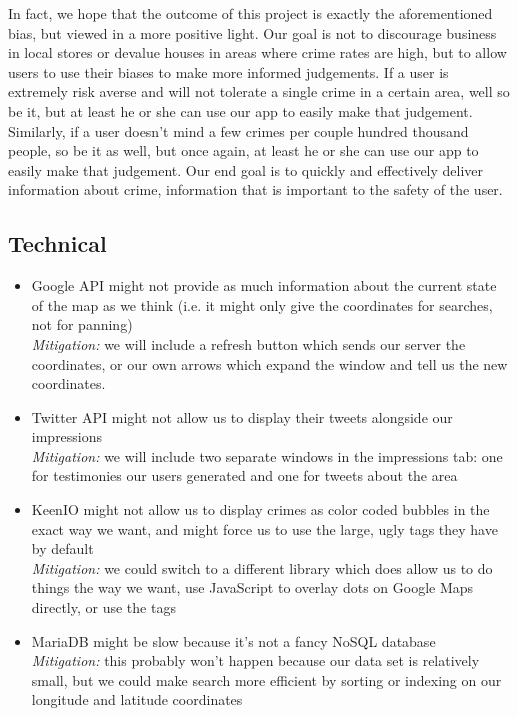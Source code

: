 \documentclass[paper=a4, fontsize=11pt]{scrartcl} %
\numberwithin{equation}{section} %
\numberwithin{figure}{section} %
\numberwithin{table}{section} %
\begin{document}
In fact, we hope that the outcome of this project is exactly the aforementioned bias, but viewed in a more positive light. Our goal is not to discourage business in local stores or devalue houses in areas where crime rates are high, but to allow users to use their biases to make more informed judgements. If a user is extremely risk averse and will not tolerate a single crime in a certain area, well so be it, but at least he or she can use our app to easily make that judgement. Similarly, if a user doesn't mind a few crimes per couple hundred thousand people, so be it as well, but once again, at least he or she can use our app to easily make that judgement. Our end goal is to quickly and effectively deliver information about crime, information that is important to the safety of the user.

\subsection{Technical}

\begin{itemize}
  \item Google API might not provide as much information about the current state of the map as we think (i.e. it might only give the coordinates for searches, not for panning) \\
  \textit{Mitigation:} we will include a refresh button which sends our server the coordinates, or our own arrows which expand the window and tell us the new coordinates. 
  \item Twitter API might not allow us to display their tweets alongside our impressions \\
  \textit{Mitigation:} we will include two separate windows in the impressions tab: one for testimonies our users generated and one for tweets about the area 
  \item KeenIO might not allow us to display crimes as color coded bubbles in the exact way we want, and might force us to use the large, ugly tags they have by default \\
  \textit{Mitigation:} we could switch to a different library which does allow us to do things the way we want, use JavaScript to overlay dots on Google Maps directly, or use the tags
  \item MariaDB might be slow because it's not a fancy NoSQL database \\
  \textit{Mitigation:} this probably won't happen because our data set is relatively small, but we could make search more efficient by sorting or indexing on our longitude and latitude coordinates
\end{itemize}
\end{document}
